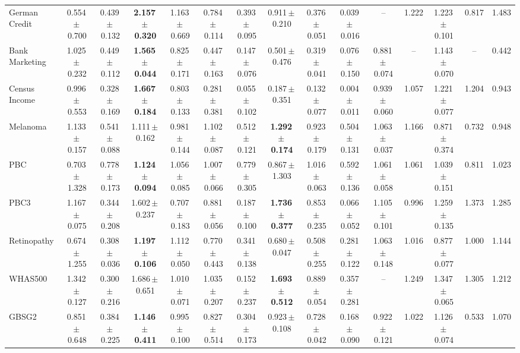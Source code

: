\documentclass[8pt]{extarticle}
\begin{document}
\begin{longtable}{l*{14}{c}}
German Credit & 0.554\,$\pm$\,0.700 & 0.439\,$\pm$\,0.132 & \textbf{2.157\,$\pm$\,0.320} & 1.163\,$\pm$\,0.669 & 0.784\,$\pm$\,0.114 & 0.393\,$\pm$\,0.095 & 0.911\,$\pm$\,0.210 & 0.376\,$\pm$\,0.051 & 0.039\,$\pm$\,0.016 & -- & 1.222 & 1.223\,$\pm$\,0.101 & 0.817 & 1.483 \\
Bank Marketing & 1.025\,$\pm$\,0.232 & 0.449\,$\pm$\,0.112 & \textbf{1.565\,$\pm$\,0.044} & 0.825\,$\pm$\,0.171 & 0.447\,$\pm$\,0.163 & 0.147\,$\pm$\,0.076 & 0.501\,$\pm$\,0.476 & 0.319\,$\pm$\,0.041 & 0.076\,$\pm$\,0.150 & 0.881\,$\pm$\,0.074 & -- & 1.143\,$\pm$\,0.070 & -- & 0.442 \\
Census Income & 0.996\,$\pm$\,0.553 & 0.328\,$\pm$\,0.169 & \textbf{1.667\,$\pm$\,0.184} & 0.803\,$\pm$\,0.133 & 0.281\,$\pm$\,0.381 & 0.055\,$\pm$\,0.102 & 0.187\,$\pm$\,0.351 & 0.132\,$\pm$\,0.077 & 0.004\,$\pm$\,0.011 & 0.939\,$\pm$\,0.060 & 1.057 & 1.221\,$\pm$\,0.077 & 1.204 & 0.943 \\
Melanoma & 1.133\,$\pm$\,0.157 & 0.541\,$\pm$\,0.088 & 1.111\,$\pm$\,0.162 & 0.981\,$\pm$\,0.144 & 1.102\,$\pm$\,0.087 & 0.512\,$\pm$\,0.121 & \textbf{1.292\,$\pm$\,0.174} & 0.923\,$\pm$\,0.179 & 0.504\,$\pm$\,0.131 & 1.063\,$\pm$\,0.037 & 1.166 & 0.871\,$\pm$\,0.374 & 0.732 & 0.948 \\
PBC & 0.703\,$\pm$\,1.328 & 0.778\,$\pm$\,0.173 & \textbf{1.124\,$\pm$\,0.094} & 1.056\,$\pm$\,0.085 & 1.007\,$\pm$\,0.066 & 0.779\,$\pm$\,0.305 & 0.867\,$\pm$\,1.303 & 1.016\,$\pm$\,0.063 & 0.592\,$\pm$\,0.136 & 1.061\,$\pm$\,0.058 & 1.061 & 1.039\,$\pm$\,0.151 & 0.811 & 1.023 \\
PBC3 & 1.167\,$\pm$\,0.075 & 0.344\,$\pm$\,0.208 & 1.602\,$\pm$\,0.237 & 0.707\,$\pm$\,0.183 & 0.881\,$\pm$\,0.056 & 0.187\,$\pm$\,0.100 & \textbf{1.736\,$\pm$\,0.377} & 0.853\,$\pm$\,0.235 & 0.066\,$\pm$\,0.052 & 1.105\,$\pm$\,0.101 & 0.996 & 1.259\,$\pm$\,0.135 & 1.373 & 1.285 \\
Retinopathy & 0.674\,$\pm$\,1.255 & 0.308\,$\pm$\,0.036 & \textbf{1.197\,$\pm$\,0.106} & 1.112\,$\pm$\,0.050 & 0.770\,$\pm$\,0.443 & 0.341\,$\pm$\,0.138 & 0.680\,$\pm$\,0.047 & 0.508\,$\pm$\,0.255 & 0.281\,$\pm$\,0.122 & 1.063\,$\pm$\,0.148 & 1.016 & 0.877\,$\pm$\,0.077 & 1.000 & 1.144 \\
WHAS500 & 1.342\,$\pm$\,0.127 & 0.300\,$\pm$\,0.216 & 1.686\,$\pm$\,0.651 & 1.010\,$\pm$\,0.071 & 1.035\,$\pm$\,0.207 & 0.152\,$\pm$\,0.237 & \textbf{1.693\,$\pm$\,0.512} & 0.889\,$\pm$\,0.054 & 0.357\,$\pm$\,0.281 & -- & 1.249 & 1.347\,$\pm$\,0.065 & 1.305 & 1.212 \\
GBSG2 & 0.851\,$\pm$\,0.648 & 0.384\,$\pm$\,0.225 & \textbf{1.146\,$\pm$\,0.411} & 0.995\,$\pm$\,0.100 & 0.827\,$\pm$\,0.514 & 0.304\,$\pm$\,0.173 & 0.923\,$\pm$\,0.108 & 0.728\,$\pm$\,0.042 & 0.168\,$\pm$\,0.090 & 0.922\,$\pm$\,0.121 & 1.022 & 1.126\,$\pm$\,0.074 & 0.533 & 1.070 \\

\end{longtable}
\end{document}

